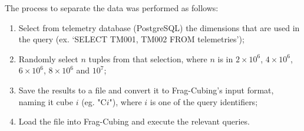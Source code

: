       The process to separate the data was performed as follows:

      \begin{enumerate}[leftmargin=*,labelsep=5.8mm]
      \item Select from telemetry database (PostgreSQL) the dimensions that are used in the query (ex. `SELECT TM001, TM002 FROM telemetries');
      \item Randomly select $n$ tuples from that selection, where $n$ is in \(\ensuremath{2\times 10^{6}}\), \(\ensuremath{4\times 10^{6}}\), \(\ensuremath{6\times 10^{6}}\), \(\ensuremath{8\times 10^{6}}\) and \(\ensuremath{10^{7}}\);
      \item Save the results to a file and convert it to Frag-Cubing's input format, naming it cube $i$ (eg. "C$i$"), where $i$ is one of the query identifiers;
      \item Load the file into Frag-Cubing and execute the relevant queries.
      \end{enumerate}


